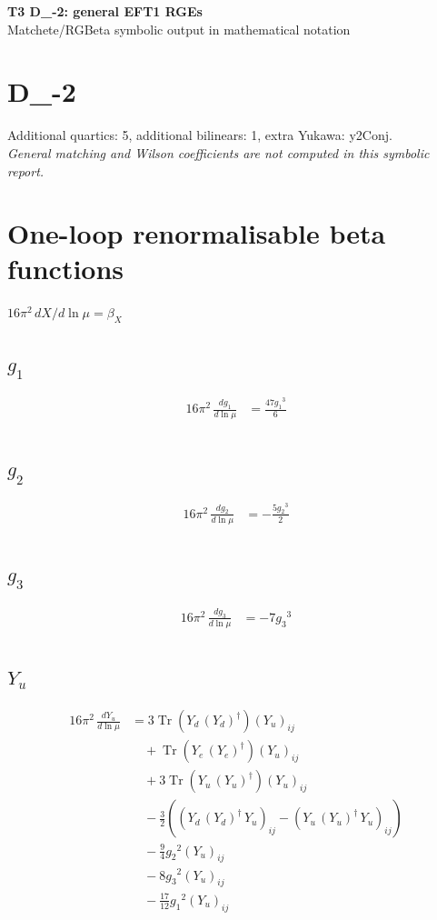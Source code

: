 \documentclass[10pt,a4paper]{article}
\begin{document}
\begin{center}
{\Large\bfseries T3 D\_-2: general EFT1 RGEs}\\[4pt]
Matchete/RGBeta symbolic output in mathematical notation
\end{center}
\bigskip
\section*{D\_-2}
Additional quartics: 5, additional bilinears: 1, extra Yukawa: y2Conj.\\
\emph{General matching and Wilson coefficients are not computed in this symbolic report.}
\clearpage
\section*{One-loop renormalisable beta functions}
$16\pi^2\,dX/d\ln\mu=\beta_X$
\subsection*{$g_1$}
\begin{align*}
16\pi^2\,\frac{d g_1}{d\ln\mu} &=\frac{47 {g_1}^3}{6} \\
\end{align*}
\subsection*{$g_2$}
\begin{align*}
16\pi^2\,\frac{d g_2}{d\ln\mu} &=-\frac{5 {g_2}^3}{2} \\
\end{align*}
\subsection*{$g_3$}
\begin{align*}
16\pi^2\,\frac{d g_3}{d\ln\mu} &=-7 {g_3}^3 \\
\end{align*}
\subsection*{$Y_u$}
\begin{align*}
16\pi^2\,\frac{d Y_u}{d\ln\mu} &=3 \operatorname{Tr}\!\left({Y_d}\,\left({Y_d}\right)^{\dagger}\right) \left({Y_u}\right)_{ij} \\
&\quad +\operatorname{Tr}\!\left({Y_e}\,\left({Y_e}\right)^{\dagger}\right) \left({Y_u}\right)_{ij} \\
&\quad +3 \operatorname{Tr}\!\left({Y_u}\,\left({Y_u}\right)^{\dagger}\right) \left({Y_u}\right)_{ij} \\
&\quad -\frac{3}{2} (\left({Y_d}\,\left({Y_d}\right)^{\dagger}\,{Y_u}\right)_{ij}-\left({Y_u}\,\left({Y_u}\right)^{\dagger}\,{Y_u}\right)_{ij}) \\
&\quad -\frac{9}{4} {g_2}^2 \left({Y_u}\right)_{ij} \\
&\quad -8 {g_3}^2 \left({Y_u}\right)_{ij} \\
&\quad -\frac{17}{12} {g_1}^2 \left({Y_u}\right)_{ij} \\
\end{align*}
\end{document}
